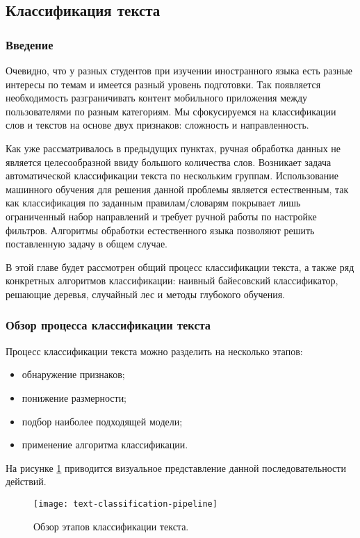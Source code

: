 \subsection{Классификация текста}

\subsubsection{Введение}
Очевидно, что у разных студентов при изучении иностранного языка есть разные интересы по темам и имеется разный уровень подготовки. Так появляется необходимость разграничивать контент мобильного приложения между пользователями по разным категориям. Мы сфокусируемся на классификации слов и текстов на основе двух признаков: сложность и направленность. 

Как уже рассматривалось в предыдущих пунктах, ручная обработка данных не является целесообразной ввиду большого количества слов. Возникает задача автоматической классификации текста по нескольким группам. Использование машинного обучения для решения данной проблемы является естественным, так как классификация по заданным правилам/словарям покрывает лишь ограниченный набор направлений и требует ручной работы по настройке фильтров. Алгоритмы обработки естественного языка позволяют решить поставленную задачу в общем случае.

В этой главе будет рассмотрен общий процесс классификации текста, а также ряд конкретных алгоритмов классификации: наивный байесовский классификатор, решающие деревья, случайный лес и методы глубокого обучения.

\subsubsection{Обзор процесса классификации текста}
Процесс классификации текста можно разделить на несколько этапов:
\begin{itemize}
	\item обнаружение признаков;
	\item понижение размерности;
	\item подбор наиболее подходящей модели;
	\item применение алгоритма классификации.
\end{itemize}
На рисунке \ref{fig:text-classification-pipeline} приводится визуальное представление данной последовательности действий.
\begin{figure}[h]
	\centering
	\texttt{[image: text-classification-pipeline]}
	\caption{Обзор этапов классификации текста.}
	\label{fig:text-classification-pipeline}
\end{figure}

